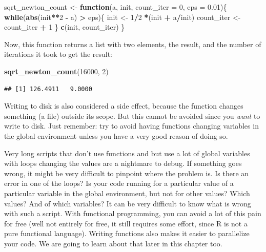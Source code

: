 \documentclass[]{gitbook}
\newenvironment{Shaded}{\begin{snugshade}}{\end{snugshade}}
\newcommand{\ControlFlowTok}[1]{\textcolor[rgb]{0.13,0.29,0.53}{\textbf{#1}}}
\newcommand{\DataTypeTok}[1]{\textcolor[rgb]{0.13,0.29,0.53}{#1}}
\newcommand{\DecValTok}[1]{\textcolor[rgb]{0.00,0.00,0.81}{#1}}
\newcommand{\FloatTok}[1]{\textcolor[rgb]{0.00,0.00,0.81}{#1}}
\newcommand{\KeywordTok}[1]{\textcolor[rgb]{0.13,0.29,0.53}{\textbf{#1}}}
\newcommand{\NormalTok}[1]{#1}
\newcommand{\OperatorTok}[1]{\textcolor[rgb]{0.81,0.36,0.00}{\textbf{#1}}}
\newcommand{\StringTok}[1]{\textcolor[rgb]{0.31,0.60,0.02}{#1}}
\begin{document}
\begin{Shaded}
\begin{Highlighting}[]
\NormalTok{sqrt_newton_count <-}\StringTok{ }\ControlFlowTok{function}\NormalTok{(a, init, }\DataTypeTok{count_iter =} \DecValTok{0}\NormalTok{, }\DataTypeTok{eps =} \FloatTok{0.01}\NormalTok{)\{}
    \ControlFlowTok{while}\NormalTok{(}\KeywordTok{abs}\NormalTok{(init}\OperatorTok{**}\DecValTok{2} \OperatorTok{-}\StringTok{ }\NormalTok{a) }\OperatorTok{>}\StringTok{ }\NormalTok{eps)\{}
\NormalTok{        init <-}\StringTok{ }\DecValTok{1}\OperatorTok{/}\DecValTok{2} \OperatorTok{*}\NormalTok{(init }\OperatorTok{+}\StringTok{ }\NormalTok{a}\OperatorTok{/}\NormalTok{init)}
\NormalTok{        count_iter <-}\StringTok{ }\NormalTok{count_iter }\OperatorTok{+}\StringTok{ }\DecValTok{1}
\NormalTok{    \}}
    \KeywordTok{c}\NormalTok{(init, count_iter)}
\NormalTok{\}}
\end{Highlighting}
\end{Shaded}

Now, this function returns a list with two elements, the result, and the number of iterations it
took to get the result:

\begin{Shaded}
\begin{Highlighting}[]
\KeywordTok{sqrt_newton_count}\NormalTok{(}\DecValTok{16000}\NormalTok{, }\DecValTok{2}\NormalTok{)}
\end{Highlighting}
\end{Shaded}

\begin{verbatim}
## [1] 126.4911   9.0000
\end{verbatim}

Writing to disk is also considered a side effect, because the function changes something (a file)
outside its scope. But this cannot be avoided since you \emph{want} to write to disk.
Just remember: try to avoid having functions changing variables in the global environment unless
you have a very good reason of doing so.

Very long scripts that don't use functions and but use a lot of global variables with loops changing
the values are a nightmare to debug. If something goes wrong, it might be very difficult to pinpoint
where the problem is. Is there an error in one of the loops? Is your code running for a particular
value of a particular variable in the global environment, but not for other values? Which values? And
of which variables? It can be very difficult to know what is wrong with such a script.
With functional programming, you can avoid a lot of this pain for free (well not entirely for free,
it still requires some effort, since R is not a pure functional language). Writing functions also
makes it easier to parallelize your code. We are going to learn about that later in this chapter too.
\end{document}
